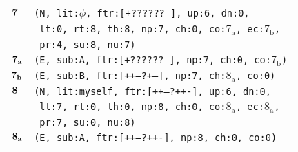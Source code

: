 \documentclass{article}
\begin{document}
\begin{minipage}{\textwidth}
{\begin{tabular}{|r|l|}
    ${\textbf{\textrm{7}}_{\phantom{z}}}$ & \texttt{\texttt{(N,~lit:$\phi$,~ftr:[+??????--],~up:6,~dn:0,}} \\
    & \texttt{\texttt{~lt:0,~rt:8,~th:8,~np:7,~ch:0,~co:${\textrm{7}_{\textrm{a}}}$,~ec:${\textrm{7}_{\textrm{b}}}$,}} \\
    & \texttt{\texttt{~pr:4,~su:8,~nu:7)}} \\
    ${\textbf{\textrm{7}}_{\textbf{\textrm{a}}}}$ & \texttt{\texttt{(E,~sub:A,~ftr:[+??????--],~np:7,~ch:0,~co:${\textrm{7}_{\textrm{b}}}$)}} \\
    ${\textbf{\textrm{7}}_{\textbf{\textrm{b}}}}$ & \texttt{\texttt{(E,~sub:B,~ftr:[++---?+--],~np:7,~ch:${\textrm{8}_{\textrm{a}}}$,~co:0)}} \\
    ${\textbf{\textrm{8}}_{\phantom{z}}}$ & \texttt{\texttt{(N,~lit:myself,~ftr:[++---?++-],~up:6,~dn:0,}} \\
    & \texttt{\texttt{~lt:7,~rt:0,~th:0,~np:8,~ch:0,~co:${\textrm{8}_{\textrm{a}}}$,~ec:${\textrm{8}_{\textrm{a}}}$,}} \\
    & \texttt{\texttt{~pr:7,~su:0,~nu:8)}} \\
    ${\textbf{\textrm{8}}_{\textbf{\textrm{a}}}}$ & \texttt{\texttt{(E,~sub:A,~ftr:[++---?++-],~np:8,~ch:0,~co:0)}} \\
    \hline
  \end{tabular}
  }
\end{minipage}
\bigbreak
\end{document}
